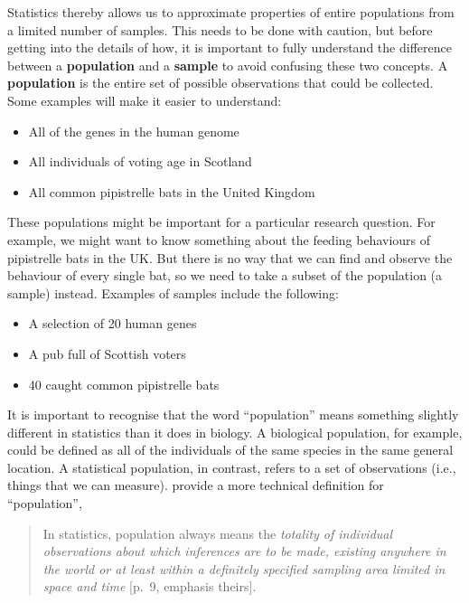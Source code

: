 \documentclass[
]{scrbook}
\providecommand{\tightlist}{%
  \setlength{\itemsep}{0pt}\setlength{\parskip}{0pt}}
\begin{document}
Statistics thereby allows us to approximate properties of entire populations from a limited number of samples.
This needs to be done with caution, but before getting into the details of how, it is important to fully understand the difference between a \textbf{population} and a \textbf{sample} to avoid confusing these two concepts.
A \textbf{population} is the entire set of possible observations that could be collected.
Some examples will make it easier to understand:

\begin{itemize}
\tightlist
\item
  All of the genes in the human genome
\item
  All individuals of voting age in Scotland
\item
  All common pipistrelle bats in the United Kingdom
\end{itemize}

These populations might be important for a particular research question.
For example, we might want to know something about the feeding behaviours of pipistrelle bats in the UK.
But there is no way that we can find and observe the behaviour of every single bat, so we need to take a subset of the population (a sample) instead.
Examples of samples include the following:

\begin{itemize}
\tightlist
\item
  A selection of 20 human genes
\item
  A pub full of Scottish voters
\item
  40 caught common pipistrelle bats
\end{itemize}

It is important to recognise that the word ``population'' means something slightly different in statistics than it does in biology.
A biological population, for example, could be defined as all of the individuals of the same species in the same general location.
A statistical population, in contrast, refers to a set of observations (i.e., things that we can measure).
\citet{Sokal1995} provide a more technical definition for ``population'',

\begin{quote}
In statistics, population always means the \emph{totality of individual observations about which inferences are to be made, existing anywhere in the world or at least within a definitely specified sampling area limited in space and time} {[}p.~9, emphasis theirs{]}.
\end{quote}
\end{document}
